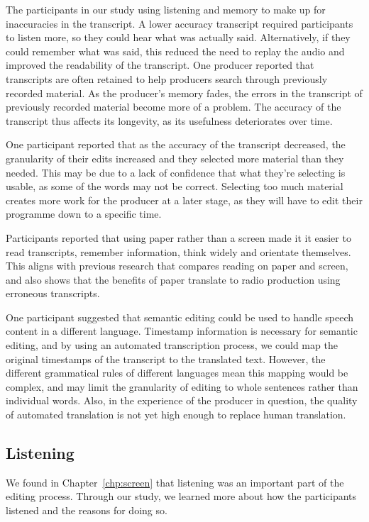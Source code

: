 The participants in our study using listening and memory to make up for inaccuracies in the transcript. A lower
accuracy transcript required participants to listen more, so they could hear what was actually said. Alternatively, if
they could remember what was said, this reduced the need to replay the audio and improved the readability of the
transcript.  One producer reported that transcripts are often retained to help producers search through previously
recorded material. As the producer's memory fades, the errors in the transcript of previously recorded material become
more of a problem. The accuracy of the transcript thus affects its longevity, as its usefulness deteriorates over time.

One participant reported that as the accuracy of the transcript decreased, the granularity of their edits increased
and they selected more material than they needed. This may be due to a lack of confidence that what they're selecting is
usable, as some of the words may not be correct. Selecting too much material creates more work for the producer at a
later stage, as they will have to edit their programme down to a specific time.

Participants reported that using paper rather than a screen made it it easier to read transcripts, remember
information, think widely and orientate themselves. This aligns with previous research that compares reading on paper
and screen, and also shows that the benefits of paper translate to radio production using erroneous transcripts.

One participant suggested that semantic editing could be used to handle speech content in a different language.
Timestamp information is necessary for semantic editing, and by using an automated transcription process, we could map
the original timestamps of the transcript to the translated text.  However, the different grammatical rules of
different languages mean this mapping would be complex, and may limit the granularity of editing to whole sentences
rather than individual words.  Also, in the experience of the producer in question, the quality of automated
translation is not yet high enough to replace human translation. 

\subsection{Listening}

We found in Chapter~\ref{chp:screen} that listening was an important part of the editing process. Through our study, we
learned more about how the participants listened and the reasons for doing so.

